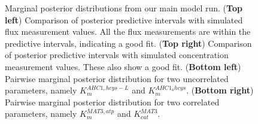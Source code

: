 \documentclass[journal=asbcd6,manuscript=article,layout=traditional]{achemso}
\begin{document}
\begin{figure}

\begin{minipage}[t]{\linewidth}

{\centering 


}

\end{minipage}%

\caption{\label{fig-posterior}Marginal posterior distributions from our
main model run. (\textbf{Top left}) Comparison of posterior predictive
intervals with simulated flux measurement values. All the flux
measurements are within the predictive intervals, indicating a good fit.
(\textbf{Top right}) Comparison of posterior predictive intervals with
simulated concentration measurement values. These also show a good fit.
(\textbf{Bottom left}) Pairwise marginal posterior distribution for two
uncorrelated parameters, namely \(K_m^{AHC1,hcys-L}\) and
\(K_m^{AHC1_ahcys}\). (\textbf{Bottom right}) Pairwise marginal
posterior distribution for two correlated parameters, namely
\(K_m^{MAT3,atp}\) and \(K_{cat}^{MAT3}\).}

\end{figure}
\end{document}
